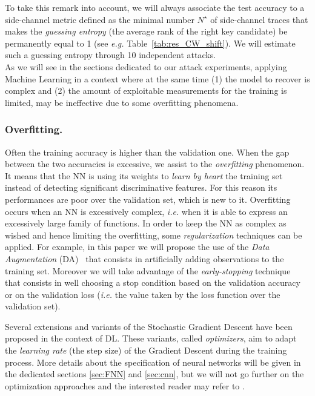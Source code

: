 To take this remark into account, we will always associate the test accuracy to a side-channel metric defined as the minimal number  $N^\star$ of side-channel traces that makes the \emph{guessing entropy} (the average rank of the right key candidate) be permanently equal to 1 (see \emph{e.g.} Table~\ref{tab:res_CW_shift}). We will estimate such a guessing entropy through 10 independent attacks. \\

As we will see in the sections dedicated to our attack experiments, applying Machine Learning in a context where at the same time (1) the model to recover is complex and (2) the amount of exploitable measurements for the training is limited, may be ineffective due to some overfitting phenomena.

\subsubsection{Overfitting.} Often the training accuracy is higher than the validation one. When the gap between the two accuracies is excessive, we assist to the \emph{overfitting} phenomenon. It means that the NN is using its weights to \emph{learn by heart} the training set instead of detecting significant discriminative features. For this reason its performances are poor over the validation set, which is new to it. Overfitting occurs when an NN is excessively complex, \emph{i.e.} when it is able to express an excessively large family of functions. In order to keep the NN as complex as wished and hence limiting the overfitting, some \emph{regularization} techniques can be applied. For example, in this paper we will propose the use of the
\emph{Data Augmentation} (DA)~\cite{simard2003best} that consists in artificially adding observations to the training set. Moreover we will take advantage of the \emph{early-stopping} technique~\cite{Prechelt2012} that consists in well choosing a stop condition based on the validation accuracy or on the validation loss (\emph{i.e.} the value taken by the loss function over the validation set).



Several extensions and variants of the Stochastic Gradient Descent have been proposed in the context of DL. These variants, called \emph{optimizers}, aim to adapt the \emph{learning rate} (the step size) of the Gradient Descent during the training process. More details about the
specification of neural networks will be given in the dedicated sections \ref{sec:FNN} and
\ref{sec:cnn}, but we will not go further on the optimization approaches and the
interested reader may refer to \cite{Goodfellow-et-al-2016}. 

